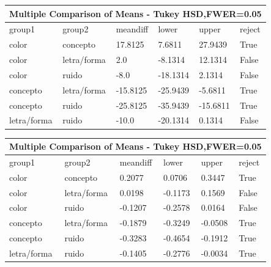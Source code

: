 \documentclass{beamer}
\begin{document}
\begin{center}
    \begin{tabular}{ | p{1.7cm} | p{1.7cm} | p{1.4cm} | p{1.4cm} | p{1.4cm} | p{0.9cm} |}
    \hline
	 \multicolumn{6}{|c|}{Multiple Comparison of Means - Tukey HSD,FWER=0.05 } \\
    \hline
     group1       &  group2      & meandiff & lower    & upper    & reject \\ 
     color        &  concepto    & 17.8125  & 7.6811   &  27.9439 & True   \\ 
     color        &  letra/forma & 2.0      & -8.1314  &  12.1314 & False  \\ 
     color        &  ruido       & -8.0     & -18.1314 &  2.1314  & False  \\ 
	 concepto     &  letra/forma & -15.8125 & -25.9439 & -5.6811  & True  \\ 
     concepto     &  ruido       & -25.8125 & -35.9439 & -15.6811 & True   \\ 
     letra/forma  &  ruido       & -10.0    & -20.1314 & 0.1314   & False  \\ 
    \end{tabular}
\end{center} 


\begin{center}
    \begin{tabular}{ | p{1.7cm} | p{1.7cm} | p{1.4cm} | p{1.4cm} | p{1.4cm} | p{0.9cm} |}
    \hline
	 \multicolumn{6}{|c|}{Multiple Comparison of Means - Tukey HSD,FWER=0.05 } \\
    \hline
     group1       &  group2      & meandiff & lower    & upper    & reject \\ 
     color        &  concepto    &  0.2077  & 0.0706   & 0.3447   & True  \\ 
     color        &  letra/forma &  0.0198  & -0.1173  & 0.1569   & False \\ 
     color        &  ruido       &  -0.1207 & -0.2578  & 0.0164   & False \\ 
	 concepto     &  letra/forma &  -0.1879 & -0.3249  & -0.0508  & True \\ 
     concepto     &  ruido       &  -0.3283 & -0.4654  & -0.1912  & True  \\ 
     letra/forma  &  ruido       &  -0.1405 & -0.2776  & -0.0034  & True \\ 
    \end{tabular}
\end{center} 
\end{document}
